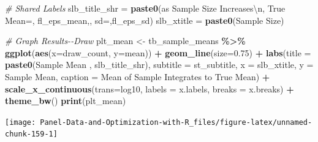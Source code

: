 \documentclass[
]{book}
\newenvironment{Shaded}{\begin{snugshade}}{\end{snugshade}}
\newcommand{\CharTok}[1]{\textcolor[rgb]{0.31,0.60,0.02}{#1}}
\newcommand{\CommentTok}[1]{\textcolor[rgb]{0.56,0.35,0.01}{\textit{#1}}}
\newcommand{\DataTypeTok}[1]{\textcolor[rgb]{0.13,0.29,0.53}{#1}}
\newcommand{\FloatTok}[1]{\textcolor[rgb]{0.00,0.00,0.81}{#1}}
\newcommand{\KeywordTok}[1]{\textcolor[rgb]{0.13,0.29,0.53}{\textbf{#1}}}
\newcommand{\NormalTok}[1]{#1}
\newcommand{\OperatorTok}[1]{\textcolor[rgb]{0.81,0.36,0.00}{\textbf{#1}}}
\newcommand{\StringTok}[1]{\textcolor[rgb]{0.31,0.60,0.02}{#1}}
\begin{document}
\begin{Shaded}
\begin{Highlighting}[]
\CommentTok{\# Shared Labels}
\NormalTok{slb\_title\_shr =}\StringTok{ }\KeywordTok{paste0}\NormalTok{(}\StringTok{\textquotesingle{}as Sample Size Increases}\CharTok{\textbackslash{}n}\StringTok{\textquotesingle{}}\NormalTok{,}
                       \StringTok{\textquotesingle{}True Mean=\textquotesingle{}}\NormalTok{, fl\_eps\_mean,}\StringTok{\textquotesingle{}, sd=\textquotesingle{}}\NormalTok{,fl\_eps\_sd)}
\NormalTok{slb\_xtitle =}\StringTok{ }\KeywordTok{paste0}\NormalTok{(}\StringTok{\textquotesingle{}Sample Size\textquotesingle{}}\NormalTok{)}

\CommentTok{\# Graph Results{-}{-}Draw}
\NormalTok{plt\_mean \textless{}{-}}\StringTok{ }\NormalTok{tb\_sample\_means }\OperatorTok{\%\textgreater{}\%}
\StringTok{  }\KeywordTok{ggplot}\NormalTok{(}\KeywordTok{aes}\NormalTok{(}\DataTypeTok{x=}\NormalTok{draw\_count, }\DataTypeTok{y=}\NormalTok{mean)) }\OperatorTok{+}
\StringTok{  }\KeywordTok{geom\_line}\NormalTok{(}\DataTypeTok{size=}\FloatTok{0.75}\NormalTok{) }\OperatorTok{+}
\StringTok{  }\KeywordTok{labs}\NormalTok{(}\DataTypeTok{title =} \KeywordTok{paste0}\NormalTok{(}\StringTok{\textquotesingle{}Sample Mean \textquotesingle{}}\NormalTok{, slb\_title\_shr),}
       \DataTypeTok{subtitle =}\NormalTok{ st\_subtitle,}
       \DataTypeTok{x =}\NormalTok{ slb\_xtitle,}
       \DataTypeTok{y =} \StringTok{\textquotesingle{}Sample Mean\textquotesingle{}}\NormalTok{,}
       \DataTypeTok{caption =} \StringTok{\textquotesingle{}Mean of Sample Integrates to True Mean\textquotesingle{}}\NormalTok{) }\OperatorTok{+}
\StringTok{  }\KeywordTok{scale\_x\_continuous}\NormalTok{(}\DataTypeTok{trans=}\StringTok{\textquotesingle{}log10\textquotesingle{}}\NormalTok{, }\DataTypeTok{labels =}\NormalTok{ x.labels, }\DataTypeTok{breaks =}\NormalTok{ x.breaks) }\OperatorTok{+}
\StringTok{  }\KeywordTok{theme\_bw}\NormalTok{()}
\KeywordTok{print}\NormalTok{(plt\_mean)}
\end{Highlighting}
\end{Shaded}

\begin{center}\texttt{[image: Panel-Data-and-Optimization-with-R\_files/figure-latex/unnamed-chunk-159-1]} \end{center}
\end{document}
